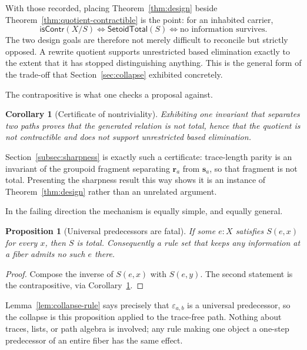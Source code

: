 \documentclass[10pt,reqno]{amsart}
\newtheorem{proposition}[theorem]{Proposition}
\newtheorem{corollary}[theorem]{Corollary}
\newcommand{\isContr}{\mathsf{isContr}}
\newcommand{\SetTot}{\mathsf{SetoidTotal}}
\begin{document}
With those recorded, placing Theorem~\ref{thm:design} beside
Theorem~\ref{thm:quotient-contractible} is the point: for an inhabited carrier,
\[
 \isContr(X/S)\iff\SetTot(S)\iff\text{no information survives.}
\tag{12.2}\label{eq:opposition}
\]
The two design goals are therefore not merely difficult to reconcile but
strictly opposed.  A rewrite quotient supports unrestricted based elimination
exactly to the extent that it has stopped distinguishing anything.  This is the
general form of the trade-off that Section~\ref{sec:collapse} exhibited
concretely.

The contrapositive is what one checks a proposal against.

\begin{corollary}[Certificate of nontriviality]
\label{cor:design-certificate}
Exhibiting one invariant that separates two paths proves that the generated
relation is not total, hence that the quotient is not contractible and does not
support unrestricted based elimination.
\end{corollary}

Section~\ref{subsec:sharpness} is exactly such a certificate: trace-length
parity is an invariant of the groupoid fragment separating \(\mathbf r_a\) from
\(\mathbf s_a\), so that fragment is not total.  Presenting the sharpness result
this way shows it is an instance of Theorem~\ref{thm:design} rather than an
unrelated argument.

In the failing direction the mechanism is equally simple, and equally general.

\begin{proposition}[Universal predecessors are fatal]
\label{prop:universal-predecessor}
If some \(e:X\) satisfies \(S(e,x)\) for every \(x\), then \(S\) is total.
Consequently a rule set that keeps any information at a fiber admits no such
\(e\) there.
\end{proposition}

\begin{proof}
Compose the inverse of \(S(e,x)\) with \(S(e,y)\).  The second statement is the
contrapositive, via Corollary~\ref{cor:design-certificate}.
\end{proof}

Lemma~\ref{lem:collapse-rule} says precisely that \(\varepsilon_{a,b}\) is a
universal predecessor, so the collapse is this proposition applied to the trace-free
path.  Nothing about traces, lists, or path algebra is involved; any rule making
one object a one-step predecessor of an entire fiber has the same effect.
\end{document}
